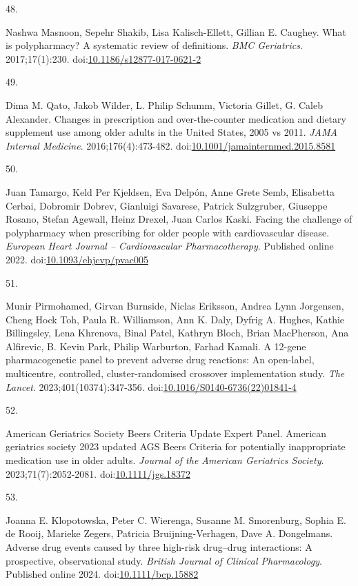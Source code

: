 \documentclass[
  12pt,
]{book}
\newlength{\cslhangindent}
\newlength{\csllabelwidth}
\newenvironment{CSLReferences}[2] %
 {\begin{list}{}{%
  \setlength{\itemindent}{0pt}
  \setlength{\leftmargin}{0pt}
  \setlength{\parsep}{0pt}
  \ifodd #1
   \setlength{\leftmargin}{\cslhangindent}
   \setlength{\itemindent}{-1\cslhangindent}
  \fi
  \setlength{\itemsep}{#2\baselineskip}}}
 {\end{list}}
\newcommand{\CSLLeftMargin}[1]{\parbox[t]{\csllabelwidth}{\strut#1\strut}}
\newcommand{\CSLRightInline}[1]{\parbox[t]{\linewidth - \csllabelwidth}{\strut#1\strut}}
\begin{document}
\begin{CSLReferences}{0}{1}
\CSLLeftMargin{48. }%
\CSLRightInline{Nashwa Masnoon, Sepehr Shakib, Lisa Kalisch-Ellett,
Gillian E. Caughey. What is polypharmacy? A systematic review of
definitions. \emph{BMC Geriatrics}. 2017;17(1):230.
doi:\href{https://doi.org/10.1186/s12877-017-0621-2}{10.1186/s12877-017-0621-2}}

\CSLLeftMargin{49. }%
\CSLRightInline{Dima M. Qato, Jakob Wilder, L. Philip Schumm, Victoria
Gillet, G. Caleb Alexander. Changes in prescription and over-the-counter
medication and dietary supplement use among older adults in the {United
States}, 2005 vs 2011. \emph{JAMA Internal Medicine}.
2016;176(4):473-482.
doi:\href{https://doi.org/10.1001/jamainternmed.2015.8581}{10.1001/jamainternmed.2015.8581}}

\CSLLeftMargin{50. }%
\CSLRightInline{Juan Tamargo, Keld Per Kjeldsen, Eva Delpón, Anne Grete
Semb, Elisabetta Cerbai, Dobromir Dobrev, Gianluigi Savarese, Patrick
Sulzgruber, Giuseppe Rosano, Stefan Agewall, Heinz Drexel, Juan Carlos
Kaski. Facing the challenge of polypharmacy when prescribing for older
people with cardiovascular disease. \emph{European Heart Journal --
Cardiovascular Pharmacotherapy}. Published online 2022.
doi:\href{https://doi.org/10.1093/ehjcvp/pvac005}{10.1093/ehjcvp/pvac005}}

\CSLLeftMargin{51. }%
\CSLRightInline{Munir Pirmohamed, Girvan Burnside, Niclas Eriksson,
Andrea Lynn Jorgensen, Cheng Hock Toh, Paula R. Williamson, Ann K. Daly,
Dyfrig A. Hughes, Kathie Billingsley, Lena Khrenova, Binal Patel,
Kathryn Bloch, Brian MacPherson, Ana Alfirevic, B. Kevin Park, Philip
Warburton, Farhad Kamali. A 12-gene pharmacogenetic panel to prevent
adverse drug reactions: An open-label, multicentre, controlled,
cluster-randomised crossover implementation study. \emph{The Lancet}.
2023;401(10374):347-356.
doi:\href{https://doi.org/10.1016/S0140-6736(22)01841-4}{10.1016/S0140-6736(22)01841-4}}

\CSLLeftMargin{52. }%
\CSLRightInline{American Geriatrics Society Beers Criteria Update Expert
Panel. American geriatrics society 2023 updated {AGS} {Beers Criteria}
for potentially inappropriate medication use in older adults.
\emph{Journal of the American Geriatrics Society}. 2023;71(7):2052-2081.
doi:\href{https://doi.org/10.1111/jgs.18372}{10.1111/jgs.18372}}

\CSLLeftMargin{53. }%
\CSLRightInline{Joanna E. Klopotowska, Peter C. Wierenga, Susanne M.
Smorenburg, Sophia E. de Rooij, Marieke Zegers, Patricia
Bruijning-Verhagen, Dave A. Dongelmans. Adverse drug events caused by
three high-risk drug--drug interactions: A prospective, observational
study. \emph{British Journal of Clinical Pharmacology}. Published online
2024. doi:\href{https://doi.org/10.1111/bcp.15882}{10.1111/bcp.15882}}


\end{CSLReferences}
\end{document}
